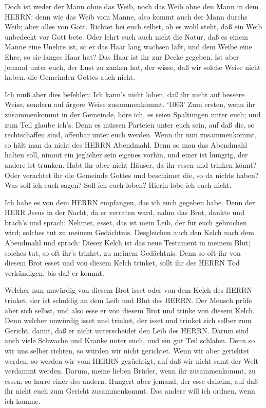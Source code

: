  Doch ist weder der Mann ohne das Weib, noch das Weib ohne
den Mann in dem HERRN;  denn wie das Weib vom Manne, also
kommt auch der Mann durchs Weib; aber alles von Gott. 
Richtet bei euch selbst, ob es wohl steht, daß ein Weib unbedeckt vor
Gott bete.  Oder lehrt euch auch nicht die Natur, daß es
einem Manne eine Unehre ist, so er das Haar lang wachsen läßt,
 und dem Weibe eine Ehre, so sie langes Haar hat? Das Haar
ist ihr zur Decke gegeben.  Ist aber jemand unter euch, der
Lust zu zanken hat, der wisse, daß wir solche Weise nicht haben, die
Gemeinden Gottes auch nicht.

 Ich muß aber dies befehlen: Ich kann's nicht loben, daß
ihr nicht auf bessere Weise, sondern auf ärgere Weise zusammenkommt.
 `1063' Zum ersten, wenn ihr zusammenkommt in der Gemeinde,
höre ich, es seien Spaltungen unter euch; und zum Teil glaube ich's.
 Denn es müssen Parteien unter euch sein, auf daß die, so
rechtschaffen sind, offenbar unter euch werden.  Wenn ihr
nun zusammenkommt, so hält man da nicht des HERRN Abendmahl.
 Denn so man das Abendmahl halten soll, nimmt ein jeglicher
sein eigenes vorhin, und einer ist hungrig, der andere ist trunken.
 Habt ihr aber nicht Häuser, da ihr essen und trinken
könnt? Oder verachtet ihr die Gemeinde Gottes und beschämet die, so da
nichts haben? Was soll ich euch sagen? Soll ich euch loben? Hierin lobe
ich euch nicht.

 Ich habe es von dem HERRN empfangen, das ich euch gegeben
habe. Denn der HERR Jesus in der Nacht, da er verraten ward, nahm das
Brot,  dankte und brach's und sprach: Nehmet, esset, das
ist mein Leib, der für euch gebrochen wird; solches tut zu meinem
Gedächtnis.  Desgleichen auch den Kelch nach dem Abendmahl
und sprach: Dieser Kelch ist das neue Testament in meinem Blut; solches
tut, so oft ihr's trinket, zu meinem Gedächtnis.  Denn so
oft ihr von diesem Brot esset und von diesem Kelch trinket, sollt ihr
des HERRN Tod verkündigen, bis daß er kommt.

 Welcher nun unwürdig von diesem Brot isset oder von dem
Kelch des HERRN trinket, der ist schuldig an dem Leib und Blut des
HERRN.  Der Mensch prüfe aber sich selbst, und also esse er
von diesem Brot und trinke von diesem Kelch.  Denn welcher
unwürdig isset und trinket, der isset und trinket sich selber zum
Gericht, damit, daß er nicht unterscheidet den Leib des HERRN.
 Darum sind auch viele Schwache und Kranke unter euch, und
ein gut Teil schlafen.  Denn so wir uns selber richten, so
würden wir nicht gerichtet.  Wenn wir aber gerichtet
werden, so werden wir vom HERRN gezüchtigt, auf daß wir nicht samt der
Welt verdammt werden.  Darum, meine lieben Brüder, wenn ihr
zusammenkommt, zu essen, so harre einer des andern. 
Hungert aber jemand, der esse daheim, auf daß ihr nicht euch zum Gericht
zusammenkommt. Das andere will ich ordnen, wenn ich komme.

